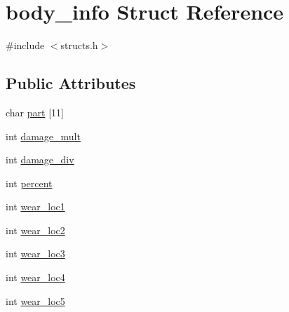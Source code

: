\hypertarget{structbody__info}{\section{body\-\_\-info Struct Reference}
\label{structbody__info}
}


{\ttfamily \#include $<$structs.\-h$>$}

\subsection*{Public Attributes}
\begin{DoxyCompactItemize}
\item 
char \hyperlink{structbody__info_a9d4ecf947592ededfe1a36b502fc78bb}{part} \mbox{[}11\mbox{]}
\item 
int \hyperlink{structbody__info_a48f0f282718fa5719f638768c17bcebf}{damage\-\_\-mult}
\item 
int \hyperlink{structbody__info_a48e556b563871623678fe8f73eda943b}{damage\-\_\-div}
\item 
int \hyperlink{structbody__info_ad73b391a0e0de991e6e2b7e1c5bce50c}{percent}
\item 
int \hyperlink{structbody__info_aca020bc5a0f3b41c37ff6ac4644f533a}{wear\-\_\-loc1}
\item 
int \hyperlink{structbody__info_a2adaf5d796aa8e451419cd12683fc132}{wear\-\_\-loc2}
\item 
int \hyperlink{structbody__info_a6f96748380df84a15cdd7a7b63c5b01f}{wear\-\_\-loc3}
\item 
int \hyperlink{structbody__info_a64a5172067829d0ce05afa46e84e8a18}{wear\-\_\-loc4}
\item 
int \hyperlink{structbody__info_acd7eadf994811223deae1fcb6d655bf8}{wear\-\_\-loc5}
\end{DoxyCompactItemize}


